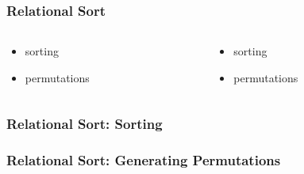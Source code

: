 \documentclass[xcolor=table, aspectratio=169]{beamer}
\newcommand{\happyCheck}{\color{green}{\checkmark}}
\newcommand{\timeout}{\color{red}{\clock}}
\begin{document}
\begin{frame}[fragile]
  \frametitle{Relational Sort}
\begin{columns}
  \begin{column}[t]{0.49\textwidth}
    

    \vfill

    \begin{center}
      \begin{minipage}{0.4\textwidth}
        \begin{itemize}
          \item[\happyCheck] sorting
          \item[\timeout] permutations
        \end{itemize}
      \end{minipage}
    \end{center}

  \end{column}
  \begin{column}[t]{0.49\textwidth}
    

    \vfill

    \begin{center}
      \begin{minipage}{0.4\textwidth}
        \begin{itemize}
          \item[\timeout] sorting
          \item[\happyCheck] permutations
        \end{itemize}
      \end{minipage}
    \end{center}


  \end{column}
\end{columns}
\end{frame}

\begin{frame}[fragile]
  \frametitle{Relational Sort: Sorting}
    
\end{frame}


\begin{frame}[fragile]
  \frametitle{Relational Sort: Generating Permutations}
    
\end{frame}
\end{document}

